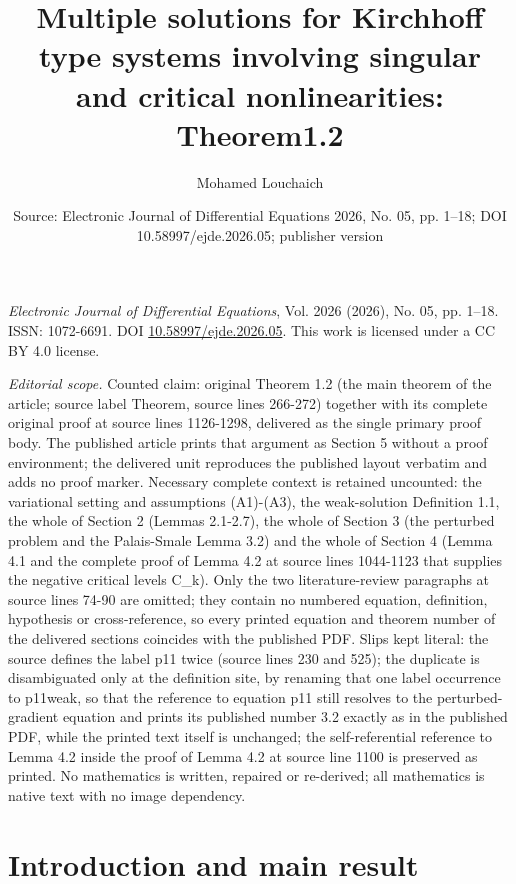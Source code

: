 \documentclass[10pt,a4paper]{amsart}
\title[Multiple solutions for Kirchhoff type systems involving sing]{Multiple solutions for Kirchhoff type systems involving singular and critical nonlinearities: Theorem1.2}
\author{Mohamed Louchaich}
\date{Source: Electronic Journal of Differential Equations 2026, No. 05, pp. 1--18; DOI 10.58997/ejde.2026.05; publisher version}
\numberwithin{equation}{section}
\begin{document}
\maketitle
\noindent\emph{Electronic Journal of Differential Equations}, Vol. 2026 (2026), No. 05, pp. 1--18.\newline
ISSN: 1072-6691. DOI \href{https://doi.org/10.58997/ejde.2026.05}{10.58997/ejde.2026.05}. This work is licensed under a CC BY 4.0 license.\par\smallskip
\noindent\textit{Editorial scope.} Counted claim: original Theorem 1.2 (the main theorem of the article; source label Theorem, source lines 266-272) together with its complete original proof at source lines 1126-1298, delivered as the single primary proof body. The published article prints that argument as Section 5 without a proof environment; the delivered unit reproduces the published layout verbatim and adds no proof marker. Necessary complete context is retained uncounted: the variational setting and assumptions (A1)-(A3), the weak-solution Definition 1.1, the whole of Section 2 (Lemmas 2.1-2.7), the whole of Section 3 (the perturbed problem and the Palais-Smale Lemma 3.2) and the whole of Section 4 (Lemma 4.1 and the complete proof of Lemma 4.2 at source lines 1044-1123 that supplies the negative critical levels C\_k). Only the two literature-review paragraphs at source lines 74-90 are omitted; they contain no numbered equation, definition, hypothesis or cross-reference, so every printed equation and theorem number of the delivered sections coincides with the published PDF. Slips kept literal: the source defines the label p11 twice (source lines 230 and 525); the duplicate is disambiguated only at the definition site, by renaming that one label occurrence to p11weak, so that the reference to equation p11 still resolves to the perturbed-gradient equation and prints its published number 3.2 exactly as in the published PDF, while the printed text itself is unchanged; the self-referential reference to Lemma 4.2 inside the proof of Lemma 4.2 at source line 1100 is preserved as printed. No mathematics is written, repaired or re-derived; all mathematics is native text with no image dependency.
\section{Introduction and main result}
\end{document}
